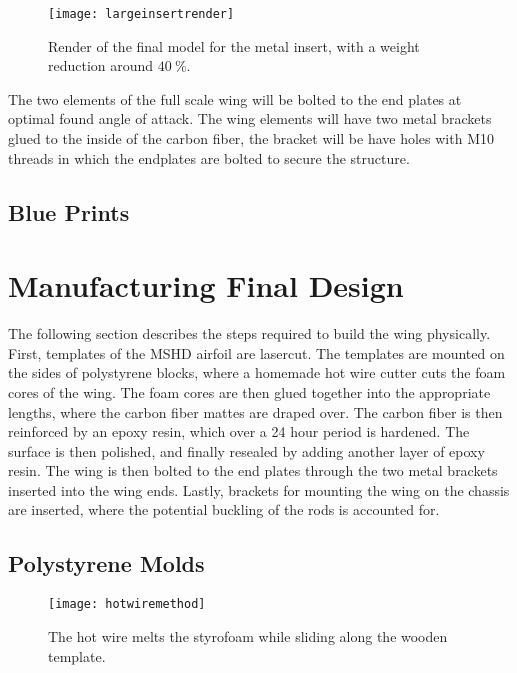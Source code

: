   \begin{figure}
    \texttt{[image: largeinsertrender]}
    \caption{Render of the final model for the metal insert, with a weight reduction around $\SI{40}{\%}$.}
    \label{fig:render_large_insert}
  \end{figure}

  The two elements of the full scale wing will be bolted to the end plates at optimal found angle of attack. The wing elements will have two metal brackets glued to the inside of the carbon fiber, the bracket will be have holes with M10 threads in which the endplates are bolted to secure the structure.

  \subsection{Blue Prints}

\section{Manufacturing Final Design}

  The following section describes the steps required to build the wing physically. First, templates of the MSHD airfoil are lasercut. The templates are mounted on the sides of polystyrene blocks, where a homemade hot wire cutter cuts the foam cores of the wing. The foam cores are then glued together into the appropriate lengths, where the carbon fiber mattes are draped over. The carbon fiber is then reinforced by an epoxy resin, which over a 24 hour period is hardened. The surface is then polished, and finally resealed by adding another layer of epoxy resin. The wing is then bolted to the end plates through the two metal brackets inserted into the wing ends. Lastly, brackets for mounting the wing on the chassis are inserted, where the potential buckling of the rods is accounted for.

  \subsection{Polystyrene Molds}

  \begin{figure}
    \texttt{[image: hotwiremethod]}
    \caption{The hot wire melts the styrofoam while sliding along the wooden template.}
    \label{fig:hotwire}
  \end{figure}

